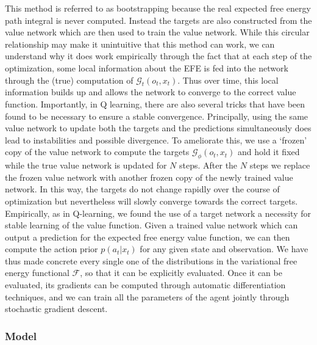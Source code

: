 This method is referred to as bootstrapping because the real expected free energy path integral is never computed. Instead the targets are also constructed from the value network which are then used to train the value network. While this circular relationship may make it unintuitive that this method can work, we can understand why it does work empirically through the fact that at each step of the optimization, some local information about the EFE is fed into the network through the (true) computation of $\mathcal{G}_t(o_t, x_t)$. Thus over time, this local information builds up and allows the network to converge to the correct value function. Importantly, in Q learning, there are also several tricks that have been found to be necessary to ensure a stable convergence. Principally, using the same value network to update both the targets and the predictions simultaneously does lead to instabilities and possible divergence. To ameliorate this, we use a `frozen' copy of the value network to compute the targets $\mathcal{G}_\phi(o_t, x_t)$ and hold it fixed while the true value network is updated for $N$ steps. After the $N$ steps we replace the frozen value network with another frozen copy of the newly trained value network. In this way, the targets do not change rapidly over the course of optimization but nevertheless will slowly converge towards the correct targets. Empirically, as in Q-learning, we found the use of a target network a necessity for stable learning of the value function.  Given a trained value network which can output a prediction for the expected free energy value function, we can then compute the action prior $p(a_t | x_t)$ for any given state and observation. We have thus made concrete every single one of the distributions in the variational free energy functional $\mathcal{F}$, so that it can be explicitly evaluated. Once it can be evaluated, its gradients can be computed through automatic differentiation techniques, and we can train all the parameters of the agent jointly through stochastic gradient descent.

\subsubsection{Model}

